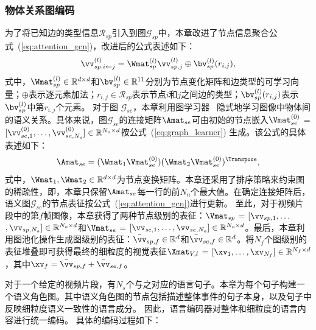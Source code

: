 \subsubsection{物体关系图编码}
为了将已知边的类型信息$\mathcal{R}_{sp}$引入到图$\mathcal{G}_{sp}$中，本章改进了节点信息聚合公式~(\ref{eq:attention_gcn})，改进后的公式表述如下：
\begin{equation}
\vv_{sp, i\leftarrow j}^{(l)} = \Wmat_{sp}^{(l)} \vv_{sp, j}^{(l)} \oplus \bv_{sp}^{(l)}(r_{i,j}),
\end{equation} 
式中，$\Wmat_{sp}^{(l)} \in \mathbb{R}^{d \times d}$和$\bv_{sp}^{(l)} \in \mathbb{R}^{11}$分别为节点变化矩阵和边类型的可学习向量；$\oplus$表示逐元素加法；$r_{i,j} \in \mathcal{R}_{sp}$表示节点$i$和$j$之间边的类型；$\bv_{sp}^{(l)}(r_{i,j})$表示$\bv_{sp}^{(l)}$中第$r_{i,j}$个元素。
对于图 $\mathcal{G}_{se}$，本章利用图学习器~\cite{norcliffe2018learning} 隐式地学习图像中物体间的语义关系。具体来说，图$\mathcal{G}_{se}$的连接矩阵$\Amat_{se}$可由初始的节点嵌入$\Vmat_{se}^{(0)}$ = $[\vv_{se,1}^{(0)}, \dots, \vv_{se,N_o}^{(0)}] \in \mathbb{R}^{N_o \times d}$按公式~(\ref{eq:graph_learner}) 生成。该公式的具体表述如下：
\begin{equation}
\Amat_{se} = (\Wmat_1 \Vmat_{se}^{(0)}) (\Wmat_2 \Vmat_{se}^{(0)})^{\Transpose},
\label{eq:graph_learner}
\end{equation}
式中，$\Wmat_1, \Wmat_2 \in \mathbb{R}^{d \times d}$为节点变换矩阵。本章还采用了排序策略来约束图的稀疏性，即，本章只保留$\Amat_{se}$每一行的前$N_n$个最大值。在确定连接矩阵后，语义图$\mathcal{G}_{se}$的节点表征按公式~(\ref{eq:attention_gcn})进行更新。
至此，对于视频片段中的第$f$帧图像，本章获得了两种节点级别的表征：$\Vmat_{sp}$ = $[\vv_{sp, 1}, \dots$ $, \vv_{sp, N_o}] \in \mathbb{R}^{N_o\times d}$和$\Vmat_{se}$ = $[\vv_{se, 1}, \dots, \vv_{se, N_o}] \in \mathbb{R}^{N_o\times d}$。最后，本章利用图池化操作生成图级别的表征：$\bar{\vv}_{sp, f}\in \mathbb{R}^d$和$\bar{\vv}_{se, f}\in \mathbb{R}^d$。将$N_f$个图级别的表征堆叠即可获得最终的细粒度的视觉表征$\Xmat_{V, l}$ = $[\xv_1, \dots, \xv_{N_f}]\in \mathbb{R}^{N_f \times d}$，其中$\xv_f=\bar{\vv}_{sp,f} + \bar{\vv}_{se,f}$。


\label{subsec:c2_srg}
对于一个给定的视频片段，有$N_s$个与之对应的语言句子。本章为每个句子构建一个语义角色图。其中语义角色图的节点包括描述整体事件的句子本身，以及句子中反映细粒度语义一致性的语言成分。
因此，语言编码器对整体和细粒度的语言内容进行统一编码。
具体的编码过程如下：

